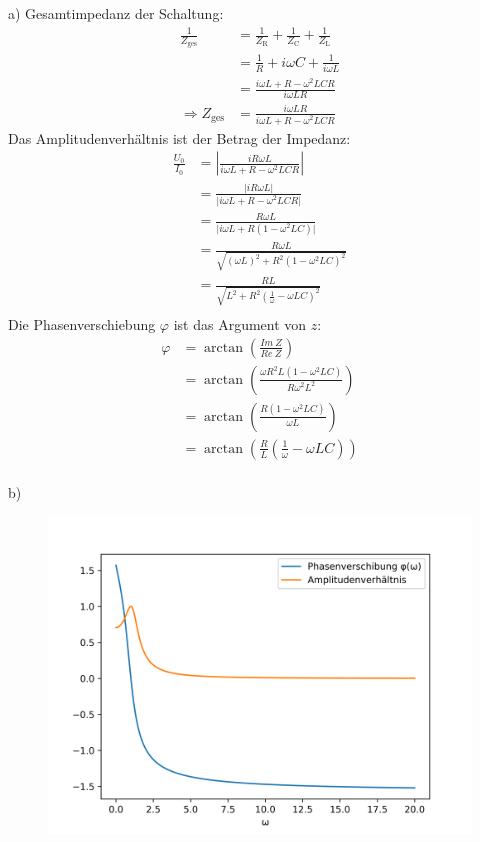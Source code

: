 \documentclass[11pt a4paper]{article}
\begin{document}
a) Gesamtimpedanz der Schaltung:
\begin{align*}
	\frac1{Z_\text{ges}}
	&= \frac1{Z_\text{R}} + \frac1{Z_\text{C}} + \frac1{Z_\text{L}} \\
	&= \frac1R + i\omega C + \frac1{i\omega L} \\
	&= \frac{i\omega L + R - \omega^2 LCR}{i\omega LR} \\
	\Rightarrow
	Z_\text{ges} &= \frac{i\omega LR}{i\omega L + R - \omega^2 LCR}
\end{align*}
Das Amplitudenverhältnis ist der Betrag der Impedanz:
\begin{align*}
	\frac{U_0}{I_0}
	&= \left\vert \frac{iR\omega L}{i\omega L + R - \omega^2LCR} \right\vert \\
	&= \frac{\vert iR\omega L \vert}{\vert i\omega L + R - \omega^2LCR \vert} \\
	&= \frac{R\omega L}{\vert i\omega L + R  (1 - \omega^2LC) \vert} \\
	&= \frac{R\omega L}{\sqrt{(\omega L)^2 + R^2  (1 - \omega^2LC)^2}} \\
	&= \frac{RL}{\sqrt{L^2 + R^2  (\frac1\omega - \omega LC)^2}} \\
\end{align*}
Die Phasenverschiebung $\varphi$ ist das Argument von $z$:
\begin{align*}
	\varphi
	&= \arctan \left(\frac{Im \ Z}{Re \ Z} \right) \\
	&= \arctan \left(\frac{\omega R^2L (1 - \omega^2LC)}{R\omega^2L^2} \right) \\
	&= \arctan \left(\frac{R (1 - \omega^2LC)}{\omega L} \right) \\
	&= \arctan \left( \frac RL \left(\frac 1\omega - \omega LC \right) \right) \\
\end{align*}

\newpage
b)
\begin{figure}[H]
	\centering
	\includegraphics[width=12cm]{aufgabe3.png}
\end{figure}
\end{document}
